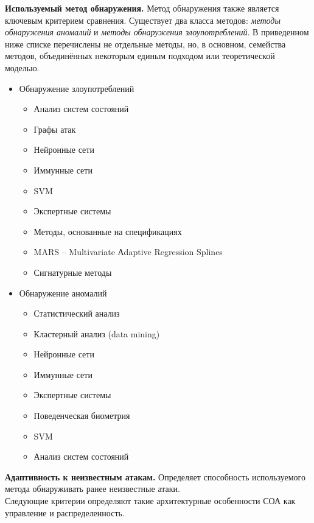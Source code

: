 \textbf{Используемый метод обнаружения.} Метод обнаружения также является ключевым критерием сравнения. Существует два класса методов: \textit{методы обнаружения аномалий} и \textit{методы обнаружения злоупотреблений}. В приведенном ниже списке перечислены не отдельные методы, но, в основном, семейства методов, объединённых некоторым единым подходом или теоретической моделью. 
\begin{itemize}

\item Обнаружение злоупотреблений

\begin{itemize}

\item Анализ систем состояний
\item Графы атак
\item Нейронные сети
\item Иммунные сети
\item SVM
\item Экспертные системы
\item Методы, основанные на спецификациях
\item MARS – Multivariate Аdaptive Regression Splines
\item Сигнатурные методы

\end{itemize}

\item Обнаружение аномалий

\begin{itemize}

\item Статистический анализ
\item Кластерный анализ (data mining)
\item Нейронные сети
\item Иммунные сети
\item Экспертные системы
\item Поведенческая биометрия
\item SVM
\item Анализ систем состояний

\end{itemize}

\end{itemize} 

\textbf{Адаптивность к неизвестным атакам.} Определяет способность используемого
метода обнаруживать ранее неизвестные атаки.\\
Следующие критерии определяют такие архитектурные особенности СОА как управление и распределенность.

